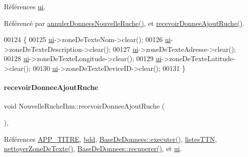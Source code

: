 Références \hyperlink{class_nouvelle_ruche_ihm_a46c1f0446fc75c67847d152d89d75960}{ui}.



Référencé par \hyperlink{class_nouvelle_ruche_ihm_a8967974b5606b7096960f3b607b5b58a}{annuler\+Donnees\+Nouvelle\+Ruche()}, et \hyperlink{class_nouvelle_ruche_ihm_a268e781b033f2531ca5eab19cc828fdc}{recevoir\+Donnee\+Ajout\+Ruche()}.


\begin{DoxyCode}
00124 \{
00125     \hyperlink{class_nouvelle_ruche_ihm_a46c1f0446fc75c67847d152d89d75960}{ui}->zoneDeTexteNom->clear();
00126     \hyperlink{class_nouvelle_ruche_ihm_a46c1f0446fc75c67847d152d89d75960}{ui}->zoneDeTexteDescription->clear();
00127     \hyperlink{class_nouvelle_ruche_ihm_a46c1f0446fc75c67847d152d89d75960}{ui}->zoneDeTexteAdresse->clear();
00128     \hyperlink{class_nouvelle_ruche_ihm_a46c1f0446fc75c67847d152d89d75960}{ui}->zoneDeTexteLongitude->clear();
00129     \hyperlink{class_nouvelle_ruche_ihm_a46c1f0446fc75c67847d152d89d75960}{ui}->zoneDeTexteLatitude->clear();
00130     \hyperlink{class_nouvelle_ruche_ihm_a46c1f0446fc75c67847d152d89d75960}{ui}->zoneDeTexteDeviceID->clear();
00131 \}
\end{DoxyCode}
\mbox{\label{class_nouvelle_ruche_ihm_a268e781b033f2531ca5eab19cc828fdc}} 
\paragraph{\texorpdfstring{recevoir\+Donnee\+Ajout\+Ruche}{recevoirDonneeAjoutRuche}}
{\footnotesize\ttfamily void Nouvelle\+Ruche\+Ihm\+::recevoir\+Donnee\+Ajout\+Ruche (\begin{DoxyParamCaption}{ }\end{DoxyParamCaption})\hspace{0.3cm}{\ttfamily [private]}, {\ttfamily [slot]}}



Références \hyperlink{parametres_8h_ace364d1ce44aa9f79bcff6e3752c4a5f}{A\+P\+P\+\_\+\+T\+I\+T\+RE}, \hyperlink{class_nouvelle_ruche_ihm_af552d9e6944c266060860d911878cff7}{bdd}, \hyperlink{class_base_de_donnees_aa8de5f8f8bb17edc43f5c0ee33712081}{Base\+De\+Donnees\+::executer()}, \hyperlink{class_nouvelle_ruche_ihm_a0c97db3419bafe928aabed3aa01d46fb}{listes\+T\+TN}, \hyperlink{class_nouvelle_ruche_ihm_a09ddd61a2bd2b6779865e7d3b93ec2eb}{nettoyer\+Zone\+De\+Texte()}, \hyperlink{class_base_de_donnees_a77539baad389f5acf754cd2cd452403e}{Base\+De\+Donnees\+::recuperer()}, et \hyperlink{class_nouvelle_ruche_ihm_a46c1f0446fc75c67847d152d89d75960}{ui}.



